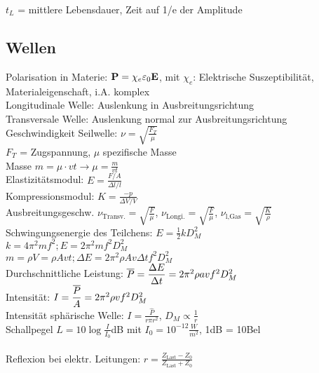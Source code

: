 \documentclass[fs, footer]{latex4ei}
\begin{document}
\begin{multicols*}{4}
$t_L$ = mittlere Lebensdauer, Zeit auf 1/e der Amplitude\\

\subsection{Wellen}
Polarisation in Materie: $\textbf{P} = \chi_e\varepsilon_0\textbf{E}$, mit $\chi_e$: Elektrische Suszeptibilität, Materialeigenschaft, i.A. komplex\\
Longitudinale Welle: Auslenkung in Ausbreitungsrichtung\\
Transversale Welle: Auslenkung normal zur Ausbreitungsrichtung\\
Geschwindigkeit Seilwelle: $\nu = \sqrt{\frac{F_T}{\mu}}$\\ 
$F_T$ = Zugspannung, $\mu$ spezifische Masse\\ %
Masse $m = \mu\cdot vt \rightarrow \mu = \frac{m}{vt}$\\
Elastizitätsmodul: $E = \frac{F / A}{\Delta l / l}$\\
Kompressionsmodul: $K = \frac{-p}{\Delta V / V}$\\
Ausbreitungsgeschw. $\nu_{\text{Transv.}} = \sqrt{\frac{F}{\mu}}$, $\nu_{\text{Longi.}} = \sqrt{\frac{F}{\mu}}$, $\nu_\text{l,Gas} = \sqrt{\frac{K}{\rho}}$\\ %
Schwingungsenergie des Teilchens: $E = \frac{1}{2}kD_M^2$\\
$k = 4\pi ^2mf^2; E = 2\pi^2mf^2D_M^2$\\
$m = \rho V = \rho A v t; \Delta E = 2\pi^2 \rho A v \Delta tf^2D_M^2$\\
Durchschnittliche Leistung: $\overline{P} = \dfrac{\Delta E}{\Delta t} = 2\pi ^2 \rho a v f^2 D_M^2$\\
Intensität: $ I = \dfrac{\overline{P}}{A} = 2\pi^2\rho v f^2D_M^2$\\
Intensität sphärische Welle: $I = \frac{\hat{P}}{r\pi r^2}$, $D_M \propto \frac{1}{r}$\\
Schallpegel $L = 10\log{\frac{I}{I_0}}$dB mit $I_0 = 10^{-12}\frac{W}{m^2}$, 1dB = 10Bel\\
\\
Reflexion bei elektr. Leitungen: $ r = \frac{Z_{\text{Last}}-Z_0}{Z_{\text{Last}}+Z_0}$\\


\end{multicols*}
\end{document}
